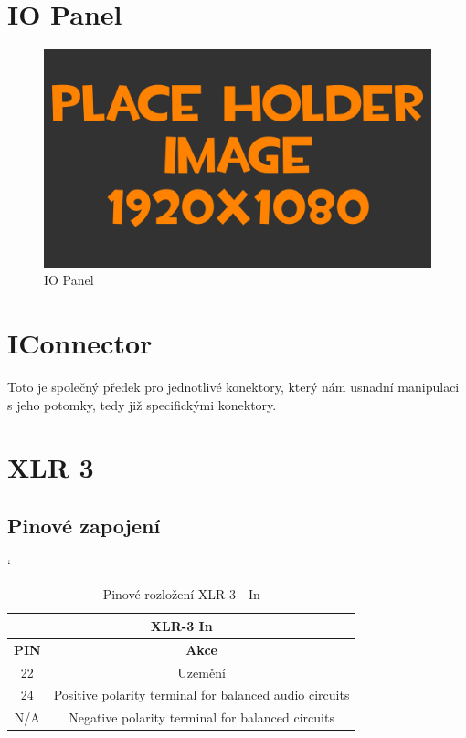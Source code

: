 
\section{IO Panel}
\begin{figure}[h!]
	\centering
	\includegraphics[width=\textwidth]{pictures/placeHolderFHD.png}
    	\caption{IO Panel}
   	\label{fig:panelIO}
\end{figure}

\section{IConnector}

Toto je společný předek pro jednotlivé konektory, který nám usnadní manipulaci s jeho potomky, tedy již specifickými konektory.

\section{XLR 3}
\subsection{Pinové zapojení}
\begin{table} [h!]
	\centering
	\catcode` %
	\begin{tabular}[c]{|| c | c ||}
	\hline
		\multicolumn{2}{||c||}{XLR-3 In} \\
	\hline
 		 \textbf{PIN} & \textbf{Akce}\\
	\hline
		22 &  Uzemění\\
	\hline
		24 & Positive polarity terminal for balanced audio circuits \\
	\hline
		N/A & Negative polarity terminal for balanced circuits \\
	\hline
	\end{tabular}
	\caption{Pinové rozložení XLR 3 - In}
	\label{table:pinXLR-IN}
\end{table}

